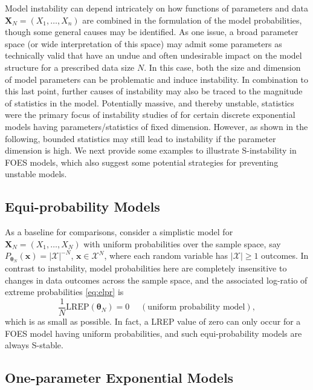 \documentclass[numbib]{imamat}
\theoremstyle{theorem}
\theoremstyle{lemma}
\theoremstyle{example}
\theoremstyle{corollary}
\theoremstyle{definition}
\theoremstyle{remark}
\theoremstyle{approximation}
\theoremstyle{scheme}
\newcommand{\REP}{\mathrm{LREP}}
\newcommand{\ak}[1]{{\color{blue} #1}}
\begin{document}
Model instability can depend intricately on how functions of parameters and data \(\boldsymbol X_N=(X_1,\ldots,X_n)\) are combined in the formulation of the model probabilities, though some general causes may be identified. As one issue, a broad parameter space (or wide interpretation of this space) may admit some parameters as technically valid that have an undue and often undesirable impact on the model structure for a prescribed data size \(N\). In this case, both the size and dimension of model parameters can be problematic and induce instability. In combination to this last point, further causes of instability may also be traced to the magnitude of statistics in the model. Potentially massive, and thereby unstable, statistics were the primary focus of instability studies of \citet{schweinberger2011instability} for certain discrete exponential models having parameters/statistics of fixed dimension. However, as shown in the following, bounded statistics may still lead to instability if the parameter dimension is high. We next \ak{provide} some examples to illustrate S-instability in FOES models, which also suggest some potential strategies for preventing unstable models.

\hypertarget{equi-probability-models}{%
\subsection{Equi-probability Models}\label{equi-probability-models}}

As a baseline for comparisons, consider a simplistic model for \(\boldsymbol X_N=(X_1,\ldots,X_N)\) with uniform probabilities over the sample space, say \(P_{\boldsymbol \theta_N}(\boldsymbol x)= |\mathcal{X}|^{-N}\), \(\boldsymbol x \in \mathcal{X}^N\), where each random variable has \(|\mathcal{X}| \geq 1\) outcomes. In contrast to instability, model probabilities here are completely insensitive to changes in data outcomes across the sample space, and the associated log-ratio of extreme probabilities \eqref{eq:elpr} is
\[
\frac{1}{N} \REP(\boldsymbol \theta_N)=0\quad \;(\text{uniform probability model}),
\]
which is as small as possible. In fact, a LREP value of zero can only occur for a FOES model having uniform probabilities, and such equi-probability models are always S-stable.

\hypertarget{one-param-exp}{%
\subsection{One-parameter Exponential Models}\label{one-param-exp}}
\end{document}
